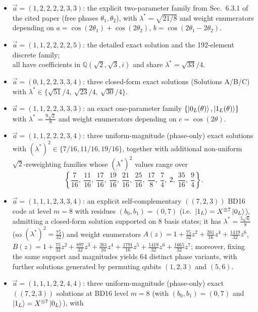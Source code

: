 \documentclass[11pt]{article}
\begin{document}
\begin{itemize}
\item \(\vec a=(1,2,2,2,2,3,3)\): the explicit two-parameter family from Sec.~6.3.1 of the cited paper (free phases \(\theta_1,\theta_2\)), with \(\lambda^\ast=\sqrt{21/8}\) and weight enumerators depending on \(a=\cos(2\theta_1)+\cos(2\theta_2)\), \(b=\cos(2\theta_1-2\theta_2)\).
\item \(\vec a=(1,1,2,2,2,2,5)\): the detailed exact solution and the 192-element discrete family;\\ all have coefficients in \(\mathbb{Q}(\sqrt2,\sqrt3,i)\) and share \(\lambda^\ast=\sqrt{33}/4\).
\item \(\vec a=(0,1,2,2,3,3,4)\): three closed-form exact solutions (Solutions A/B/C) \\
with \(\lambda^\ast\in\{\sqrt{51}/4,\ \sqrt{23}/4,\ \sqrt{30}/4\}\).
\item \(\vec a=(1,1,2,2,3,3,3)\): an exact one-parameter family \(\{\ket{0_L(\theta)},\ket{1_L(\theta)}\}\) with \(\lambda^\ast=\frac{9\sqrt2}{8}\) and weight enumerators depending on \(c=\cos(2\theta)\).
\item \(\vec a=(1,1,2,2,2,3,4)\): three uniform-magnitude (phase-only) exact solutions with \((\lambda^\ast)^2\in\{7/16,11/16,19/16\}\), together with additional non-uniform \(\sqrt2\)-reweighting families whose \((\lambda^\ast)^2\) values range over
\[
\left\{
\frac{7}{16},\ \frac{11}{16},\ \frac{17}{16},\ \frac{19}{16},\ \frac{21}{16},\ \frac{25}{16},\ \frac{17}{8},\ \frac{7}{4},\ 2,\ \frac{35}{16},\ \frac{9}{4}
\right\}.
\]
\item \(\vec a=(1,1,1,2,3,3,4)\): an explicit self-complementary \(((7,2,3))\) BD16 code at level \(m=8\) with residues \((b_0,b_1)=(0,7)\) (i.e.\ \(\ket{1_L}=X^{\otimes 7}\ket{0_L}\)), admitting a closed-form solution supported on \(8\) basis states; it has \(\lambda^\ast=\frac{5\sqrt6}{8}\) (so \((\lambda^\ast)^2=\frac{75}{32}\)) and weight enumerators
\(A(z)=1+\frac{75}{32}z^2+\frac{261}{16}z^4+\frac{1419}{32}z^6\),
\(B(z)=1+\frac{75}{32}z^2+\frac{897}{32}z^3+\frac{261}{16}z^4+\frac{1791}{16}z^5+\frac{1419}{32}z^6+\frac{1665}{32}z^7\);
moreover, fixing the same support and magnitudes yields \(64\) distinct phase variants, with further solutions generated by permuting qubits \((1,2,3)\) and \((5,6)\).
\item \(\vec a=(1,1,1,2,2,4,4)\): three uniform-magnitude (phase-only) exact \(((7,2,3))\) solutions at BD16 level \(m=8\) (with \((b_0,b_1)=(0,7)\) and \(\ket{1_L}=X^{\otimes 7}\ket{0_L}\)), with

\end{itemize}
\end{document}
